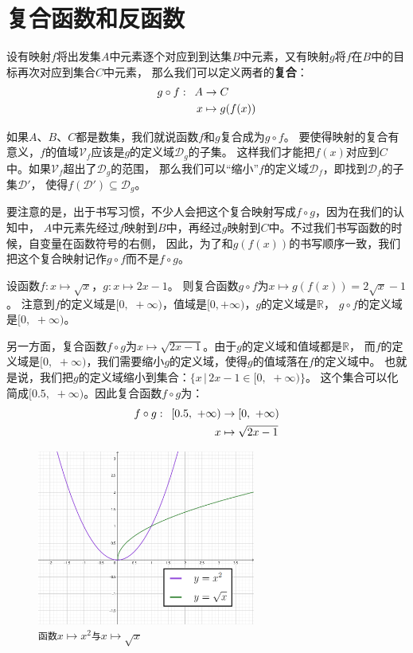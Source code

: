 \documentclass[12pt,UTF8]{ctexbook}
\begin{document}
\section{复合函数和反函数}

设有映射$f$将出发集$A$中元素逐个对应到到达集$B$中元素，又有映射$g$将$f$在$B$中的目标再次对应到集合$C$中元素，
那么我们可以定义两者的\textbf{复合}：
\begin{align}
    g\circ f : \,\,\, A &\rightarrow C \notag \\
    x &\mapsto g(f(x)) \notag
\end{align}

如果$A$、$B$、$C$都是数集，我们就说函数$f$和$g$复合成为$g\circ f$。
要使得映射的复合有意义，$f$的值域$\mathcal{V}_f$应该是$g$的定义域$\mathcal{D}_g$的子集。
这样我们才能把$f(x)$对应到$C$中。如果$\mathcal{V}_f$超出了$\mathcal{D}_g$的范围，
那么我们可以“缩小”$f$的定义域$\mathcal{D}_f$，即找到$\mathcal{D}_f$的子集$\mathcal{D}'$，
使得$f(\mathcal{D}')\subseteq \mathcal{D}_g$。

要注意的是，出于书写习惯，不少人会把这个复合映射写成$f\circ g$，因为在我们的认知中，
$A$中元素先经过$f$映射到$B$中，再经过$g$映射到$C$中。不过我们书写函数的时候，自变量在函数符号的右侧，
因此，为了和$g(f(x))$的书写顺序一致，我们把这个复合映射记作$g\circ f$而不是$f\circ g$。

设函数$f:x\mapsto \sqrt{x}$，$g:x\mapsto 2x - 1$。
则复合函数$g\circ f$为$x\mapsto g(f(x)) = 2\sqrt{x} - 1$。
注意到$f$的定义域是$[0, \,\,+\infty)$，值域是$[0, +\infty)$，$g$的定义域是$\mathbb{R}$，
$g\circ f$的定义域是$[0,\,\, +\infty)$。

另一方面，复合函数$f\circ g$为$x\mapsto \sqrt{2x - 1}$。由于$g$的定义域和值域都是$\mathbb{R}$，
而$f$的定义域是$[0,\,\, +\infty)$，我们需要缩小$g$的定义域，使得$g$的值域落在$f$的定义域中。
也就是说，我们把$g$的定义域缩小到集合：$\{x \,|\, 2x - 1 \in [0, \,\,+\infty)\}$。
这个集合可以化简成$[0.5, \,\,+\infty)$。因此复合函数$f\circ g$为：
\begin{align}
    f\circ g : \,\,\, [0.5,\,\, +\infty) &\rightarrow [0,\,\, +\infty) \notag \\
    x &\mapsto \sqrt{2x - 1} \notag
\end{align}

\begin{figure}[h] %
    \centering
    \includegraphics[width=0.64\textwidth]{反函数1.png}
    \caption*{\texttt{函数}$x\mapsto x^2$\texttt{与}$x\mapsto \sqrt{x}$}
\end{figure}
\end{document}
